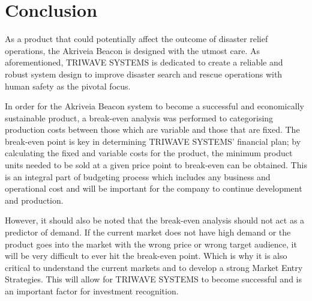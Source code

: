 

\setcounter{section}{2}
\section{Conclusion}

\bigskip
As a product that could potentially affect the outcome of disaster relief operations, the Akriveia
Beacon is designed with the utmost care. As aforementioned, TRIWAVE SYSTEMS is dedicated
to create a reliable and robust system design to improve disaster search and rescue operations
with human safety as the pivotal focus.

\bigskip
In order for the Akriveia Beacon system to become a successful and economically sustainable product, a break-even analysis was performed to categorising production costs between those which are variable and those that are fixed. The break-even point is key in determining TRIWAVE SYSTEMS’ financial plan; by calculating the fixed and variable costs for the product, the minimum product units needed to be sold at a given price point to break-even can be obtained. This is an integral part of budgeting process which includes any business and operational cost and will be important for the company to continue development and production.

\bigskip
However, it should also be noted that the break-even analysis should not act as a predictor of demand.
If the current market does not have high demand or the product goes into the market with the wrong price or wrong target audience, it will be very difficult to ever hit the break-even point. Which is why it is also critical to understand the current markets and to develop a strong Market Entry Strategies. This will allow for TRIWAVE SYSTEMS to become successful and is an important factor for investment recognition. 

